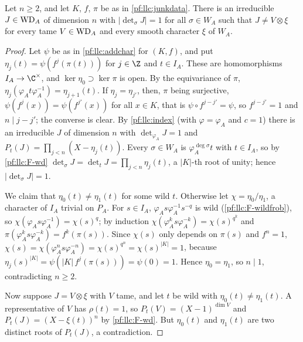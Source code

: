 \begin{lemma}\label{pf:llc:junkrep}
Let $n\ge2$, and let $K$, $f$, $\pi$ be as in \cref{pf:llc:junkdata}. There is an irreducible $J\in\mathrm{WD}_A$ of dimension $n$
with $|\det_\sigma J|=1$ for all $\sigma\in W_A$ such that $J\ne V\otimes\xi$ for every tame $V\in\mathrm{WD}_A$ and every smooth
character $\xi$ of $W_A$. 
\end{lemma}

\begin{proof}
Let $\psi$ be as in \cref{pf:llc:addchar} for $(K,f)$, and put $\eta_j(t)=\psi(f^j(\pi(t)))$ for $j\in\Z$ and $t\in I_A$.
These are homomorphisms $I_A\to\C^\times$, and $\ker\eta_0\supset\ker\pi$ is open. By the equivariance of $\pi$,
$\eta_j(\varphi_At\varphi_A^{-1})=\eta_{j+1}(t)$. If $\eta_j=\eta_{j'}$, then, $\pi$ being surjective, $\psi(f^j(x))=\psi(f^{j'}(x))$
for all $x\in K$, that is $\psi\circ f^{j-j'}=\psi$, so $f^{j-j'}=1$ and $n\mid j-j'$; the converse is clear. By
\cref{pf:llc:index} (with $\varphi=\varphi_A$ and $c=1$) there is an irreducible $J$ of dimension $n$ with $\det_{\varphi_A}J=1$
and $P_t(J)=\prod_{j<n}(X-\eta_j(t))$. Every $\sigma\in W_A$ is $\varphi_A^{\deg\sigma}t$ with $t\in I_A$, so by \ref{pf:llc:F-wd}
$\det_\sigma J=\det_tJ=\prod_{j<n}\eta_j(t)$, a $|K|$-th root of unity; hence $|\det_\sigma J|=1$.

We claim that $\eta_0(t)\ne\eta_1(t)$ for some wild $t$. Otherwise let $\chi=\eta_0/\eta_1$, a character of $I_A$ trivial on
$P_A$. For $s\in I_A$, $\varphi_As\varphi_A^{-1}s^{-q}$ is wild (\ref{pf:llc:F-wildfrob}), so $\chi(\varphi_As\varphi_A^{-1})=\chi(s)^q$;
by induction $\chi(\varphi_A^ks\varphi_A^{-k})=\chi(s)^{q^k}$ and $\pi(\varphi_A^ks\varphi_A^{-k})=f^k(\pi(s))$. Since $\chi(s)$ only
depends on $\pi(s)$ and $f^n=1$, $\chi(s)=\chi(\varphi_A^ns\varphi_A^{-n})=\chi(s)^{q^n}=\chi(s)^{|K|}=1$, because
$\eta_j(s)^{|K|}=\psi(|K|\,f^j(\pi(s)))=\psi(0)=1$. Hence $\eta_0=\eta_1$,
so $n\mid1$, contradicting $n\ge2$.

Now suppose $J=V\otimes\xi$ with $V$ tame, and let $t$ be wild with $\eta_0(t)\ne\eta_1(t)$. A representative of $V$ has
$\rho(t)=1$, so $P_t(V)=(X-1)^{\dim V}$ and $P_t(J)=(X-\xi(t))^n$ by \ref{pf:llc:F-wd}. But $\eta_0(t)$ and $\eta_1(t)$ are
two distinct roots of $P_t(J)$, a contradiction.
\end{proof}

